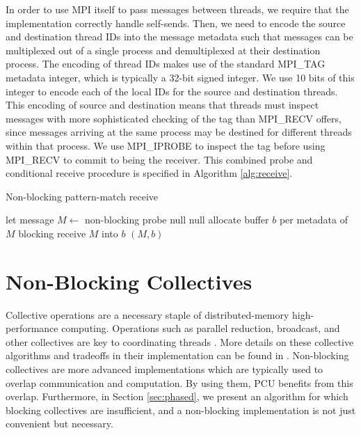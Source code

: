 \documentclass[final,1p,times]{elsarticle}
\begin{document}
In order to use MPI itself to pass messages between threads, we require
that the implementation correctly handle self-sends.
Then, we need to encode the source and destination thread IDs into the message
metadata such that messages can be multiplexed out of a single process
and demultiplexed at their destination process.
The encoding of thread IDs makes use of the standard MPI\_TAG metadata
integer, which is typically a 32-bit signed integer.
We use 10 bits of this integer to encode each of the local IDs for the
source and destination threads.
This encoding of source and destination means that threads must inspect
messages with more sophisticated checking of the tag than MPI\_RECV
offers, since messages arriving at the same process may be destined
for different threads within that process.
We use MPI\_IPROBE to inspect the tag before using MPI\_RECV to commit
to being the receiver.
This combined probe and conditional receive procedure is specified
in Algorithm \ref{alg:receive}.

\begin{algorithm}
\caption{Non-blocking pattern-match receive}
\label{alg:receive}
\begin{algorithmic}
\State let message $M \gets$ non-blocking probe
\State \Return null
\EndIf
{}
\State \Return null
\EndIf
\State allocate buffer $b$ per metadata of $M$
\State blocking receive $M$ into $b$
\State \Return $(M,b)$
\EndFunction
\end{algorithmic}
\end{algorithm}

\section{Non-Blocking Collectives}
\label{sec:coll}
Collective operations are a necessary staple of
distributed-memory high-performance computing.
Operations such as parallel reduction, broadcast, and other collectives
are key to coordinating threads \cite{pjevsivac2007performance}.
More details on these collective algorithms and tradeoffs in their
implementation can be found in \cite{thakur2003improving}.
Non-blocking collectives are more advanced implementations which
are typically used to overlap communication and computation.
By using them, PCU benefits from this overlap.
Furthermore, in Section \ref{sec:phased}, we present an algorithm
for which blocking collectives are insufficient, and a non-blocking
implementation is not just convenient but necessary.
\end{document}
